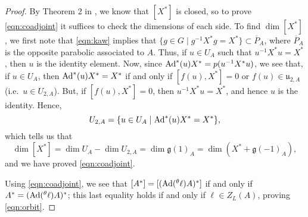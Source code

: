 \documentclass[11pt,letterpaper]{article}
\newcommand{\goth}{\mathfrak}
\newcommand{\Ad}{\textup{Ad}}
\newcommand{\ad}{\textup{ad}}
\theoremstyle{remark}
\numberwithin{equation}{section}
\begin{document}
\begin{proof}
By Theorem 2 in \cite{Ros}, we know that $[X^{\ast}]$ is closed, so to prove \eqref{eqn:coadjoint} it suffices to check the dimensions of each side. To find $\dim [X^{\ast}]$, we first note that \eqref{eqn:kaw} implies that $\{g \in G \mid g^{-1}X^{\ast}g = X^{\ast}\} \subset \overline{P}_A$, where $\overline{P}_A$ is the opposite parabolic associated to $A$. Thus, if $u \in U_A$ such that $u^{-1}X^{\ast}u = X^{\ast}$, then $u$ is the identity element. Now, since $\Ad^{\ast}(u)X^{\ast} = p(u^{-1}X^{\ast}u)$, we see that, if $u \in U_A$, then $\Ad^{\ast}(u)X^{\ast} = X^{\ast}$ if and only if $[f(u),X^{\ast}] = 0$ or $f(u) \in \mathfrak{u}_{2,A}$ (i.e.~$u \in U_{2,A}$). But, if $[f(u),X^{\ast}] = 0$, then $u^{-1}X^{\ast}u = X^{\ast}$, and hence $u$ is the identity. Hence, $$U_{2,A} = \{ u \in U_A \mid \Ad^{\ast}(u)X^{\ast} = X^{\ast}\},$$ which tells us that $$\dim [X^{\ast}] = \dim U_A - \dim U_{2,A} = \dim \goth{g}(1)_A = \dim (X^{\ast} + \goth{g}(-1)_A),$$ and we have proved \eqref{eqn:coadjoint}. 



Using \eqref{eqn:coadjoint}, we see that $[A^{\ast}] = [(\Ad(^{\theta}\ell)A)^{\ast}]$ if and only if $A^{\ast} = (\Ad(^{\theta}\ell)A)^{\ast}$; this last equality holds if and only if $\ell \in Z_L(A)$, proving \eqref{eqn:orbit}.





\end{proof}
\end{document}

